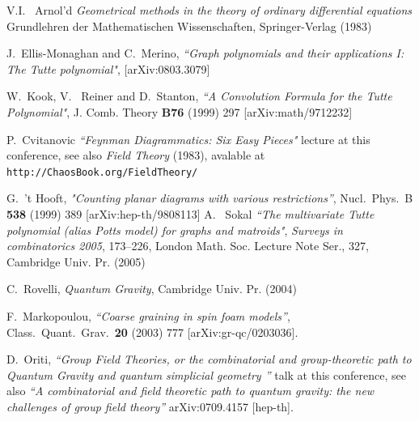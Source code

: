 \documentclass[12pt,here,feynmf]{article}
\begin{document}
\begin{thebibliography}{99}
V.I.~ Arnol'd {\it Geometrical methods in the theory of ordinary
  differential equations} Grundlehren der Mathematischen
Wissenschaften, Springer-Verlag  (1983)



J.~Ellis-Monaghan and C.~Merino,
{\it ``Graph polynomials and their applications I: The Tutte polynomial"},
[arXiv:0803.3079]



W.~Kook, V.~ Reiner and D.~Stanton,
{\it ``A Convolution Formula for the Tutte Polynomial"},
 J. Comb. Theory {\bf B76} (1999) 297
 [arXiv:math/9712232]



P.~Cvitanovic {\it ``Feynman Diagrammatics: Six Easy Pieces"} lecture at this conference, see also
{\it Field Theory} (1983), avalable at {\tt http://ChaosBook.org/FieldTheory/}


  G.~'t Hooft,
  {\it "Counting planar diagrams with various restrictions''},
  Nucl.\ Phys.\  B {\bf 538} (1999) 389
  [arXiv:hep-th/9808113]
A.~ Sokal {\it ``The multivariate Tutte polynomial (alias Potts model) for graphs and matroids"}, {\it Surveys in combinatorics 2005}, 173--226, London Math. Soc. Lecture Note Ser., 327, Cambridge Univ. Pr. (2005)


C.~Rovelli, {\it Quantum Gravity}, Cambridge Univ. Pr. (2004)

  
  F.~Markopoulou,
  {\it ``Coarse graining in spin foam models''},
  Class.\ Quant.\ Grav.\  {\bf 20} (2003) 777
  [arXiv:gr-qc/0203036].

  D.~Oriti, {\it ``Group Field Theories, or the combinatorial and group-theoretic path to Quantum Gravity
and quantum simplicial geometry
''} talk at this conference, see also
  {\it ``A combinatorial and field theoretic path to quantum gravity: the new
  challenges of group field theory''}
  arXiv:0709.4157 [hep-th].
  



\end{thebibliography}
\end{document}
